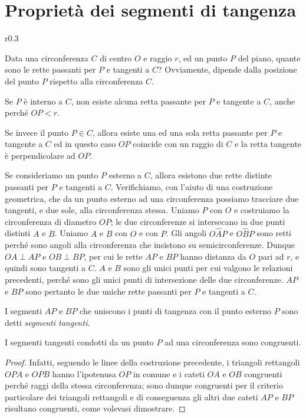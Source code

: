 \section{Proprietà dei segmenti di tangenza}\label{sect:proprieta_tangenti}

\begin{wrapfigure}{r}{0.3\textwidth}
	\centering\vspace{20pt}
\end{wrapfigure}
Data una circonferenza $C$ di centro $O$ e raggio $r$, ed un punto $P$ del piano, quante sono le rette passanti per $P$ e tangenti a $C$?  Ovviamente, dipende dalla posizione del punto $P$ rispetto alla circonferenza $C$.

Se $P$ è interno a $C$, non esiste alcuna retta passante per $P$ e tangente a $C$, anche perché $OP < r$.

Se invece il punto $P\in C$, allora esiste una ed una sola retta passante per $P$ e tangente a $C$ ed in questo caso $OP$ coincide con un raggio di $C$ e la retta tangente è perpendicolare ad $OP$.

Se consideriamo un punto $P$ esterno a $C$, allora esistono due rette distinte passanti per $P$ e tangenti a $C$. Verifichiamo, con l'aiuto di una costruzione geometrica, che da un punto esterno ad una circonferenza possiamo tracciare due tangenti, e due sole, alla circonferenza stessa.
Uniamo $P$ con $O$ e costruiamo la circonferenza di diametro $OP$; le due circonferenze si intersecano in due punti distinti $A$ e $B$. Uniamo $A$ e $B$ con $O$ e con $P$. Gli angoli $O\widehat{A}P$ e $O\widehat{B}P$ sono retti perché sono angoli alla circonferenza che insistono su semicirconferenze. Dunque $OA\perp AP$ e $OB\perp BP$, per cui le rette $AP$ e $BP$ hanno distanza da $O$ pari ad $r$, e quindi sono tangenti a $C$. $A$ e $B$ sono gli unici punti per cui valgono le relazioni precedenti, perché sono gli unici punti di intersezione delle due circonferenze. $AP$ e $BP$ sono pertanto le due uniche rette passanti per $P$ e tangenti a $C$.

I segmenti $AP$ e $BP$ che uniscono i punti di tangenza con il punto esterno $P$ sono detti \emph{segmenti tangenti}.

\begin{teorema}
I segmenti tangenti condotti da un punto $P$ ad una circonferenza sono congruenti.
\end{teorema}

\begin{proof}
Infatti, seguendo le linee della costruzione precedente, i triangoli rettangoli $OPA$ e $OPB$ hanno l'ipotenusa $OP$ in comune e i cateti $OA$ e $OB$ congruenti perché raggi della stessa circonferenza; sono dunque congruenti per il criterio particolare dei triangoli rettangoli e di conseguenza gli altri due cateti $AP$ e $BP$ risultano congruenti, come volevasi dimostrare.
\end{proof}

